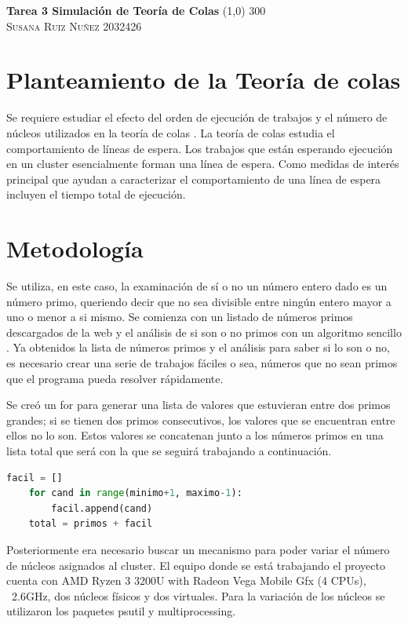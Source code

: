\documentclass{article}
\begin{document}
	\begin{center}
	\huge{\textbf{Tarea 3 Simulación de Teoría de Colas}}
	\line(1,0) {300}\\
	
	\textsc{ \Large Susana Ruiz Nuñez} 
	\textsc{ \Large 2032426}
	\end{center}


\section{Planteamiento de la Teoría de colas} 
Se requiere estudiar el efecto del orden de ejecución de trabajos y el número de núcleos utilizados en la teoría de colas \cite{satu}. La teoría de colas estudia el comportamiento de líneas de espera. Los trabajos que están esperando ejecución en un cluster esencialmente forman una línea de espera. Como medidas de interés principal que ayudan a caracterizar el comportamiento de una línea de espera incluyen el tiempo total de ejecución. 


\section{Metodología}
Se utiliza, en este caso, la examinación de sí o no un número entero dado es un número primo, queriendo decir que no sea divisible entre ningún entero mayor a uno o menor a si mismo. Se comienza con un listado de números primos descargados de la web \cite{mill} y el análisis de si son o no primos con un algoritmo sencillo \cite{satu}. Ya obtenidos la lista de números primos y el análisis para saber si lo son o no, es necesario crear una serie de trabajos fáciles o sea, números que no sean primos que el programa pueda resolver rápidamente.  

Se creó un for para generar una lista de valores que estuvieran entre dos primos grandes; si se tienen dos primos consecutivos, los valores que se encuentran entre ellos no lo son. Estos valores se concatenan junto a los números primos en una lista total que será con la que se seguirá trabajando a continuación.  

\begin{lstlisting}[language=Python]
	facil = []
	for cand in range(minimo+1, maximo-1):
		facil.append(cand)
	total = primos + facil
\end{lstlisting}

Posteriormente era necesario buscar un mecanismo para poder variar el número de núcleos asignados al cluster. El equipo donde se está trabajando el proyecto cuenta con AMD Ryzen 3 3200U with Radeon Vega Mobile Gfx   (4 CPUs), ~2.6GHz, dos núcleos físicos y dos virtuales. Para la variación de los núcleos se utilizaron los paquetes psutil y multiprocessing.
\end{document}

